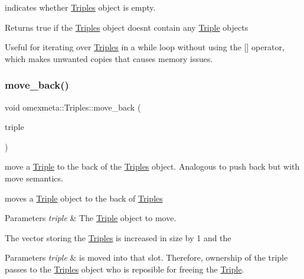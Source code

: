indicates whether \hyperlink{classomexmeta_1_1Triples}{Triples} object is empty. 

\begin{DoxyReturn}{Returns}
true if the \hyperlink{classomexmeta_1_1Triples}{Triples} object doesn\textquotesingle{}t contain any \hyperlink{classomexmeta_1_1Triple}{Triple} objects
\end{DoxyReturn}
Useful for iterating over \hyperlink{classomexmeta_1_1Triples}{Triples} in a while loop without using the {\ttfamily \mbox{[}\mbox{]}} operator, which makes unwanted copies that causes memory issues. \mbox{\label{classomexmeta_1_1Triples_a88dcf4b950f105acb621bd07f07a38a0}} 
\subsubsection{\texorpdfstring{move\+\_\+back()}{move\_back()}}
{\footnotesize\ttfamily void omexmeta\+::\+Triples\+::move\+\_\+back (\begin{DoxyParamCaption}\item[{\hyperlink{classomexmeta_1_1Triple}{Triple} \&}]{triple }\end{DoxyParamCaption})}



move a \hyperlink{classomexmeta_1_1Triple}{Triple} to the back of the \hyperlink{classomexmeta_1_1Triples}{Triples} object. Analogous to push back but with move semantics. 

moves a \hyperlink{classomexmeta_1_1Triple}{Triple} object to the back of \hyperlink{classomexmeta_1_1Triples}{Triples}


\begin{DoxyParams}{Parameters}
{\em triple} & The \hyperlink{classomexmeta_1_1Triple}{Triple} object to move.\\
\hline
\end{DoxyParams}
The vector storing the \hyperlink{classomexmeta_1_1Triples}{Triples} is increased in size by 1 and the 
\begin{DoxyParams}{Parameters}
{\em triple} & is moved into that slot. Therefore, ownership of the triple passes to the \hyperlink{classomexmeta_1_1Triples}{Triples} object who is reposible for freeing the \hyperlink{classomexmeta_1_1Triple}{Triple}. \\
\hline
\end{DoxyParams}
\mbox{\label{classomexmeta_1_1Triples_a43d540423a436986d9f72d7cf0f02d72}} 
